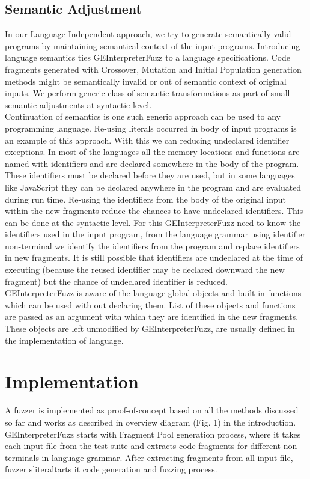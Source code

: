 \documentclass{sig-alternate}
\begin{document}
\subsection{Semantic Adjustment} \label{sec:semantics}
\indent In our Language Independent approach, we try to generate semantically valid programs by maintaining semantical context of the input programs. Introducing language semantics ties GEInterpreterFuzz to a language specifications. Code fragments generated with Crossover, Mutation and Initial Population generation   methods might be semantically invalid or out of semantic context of original inputs. We perform generic class of semantic transformations as part of small semantic adjustments at syntactic level. \\
\indent Continuation of semantics is one such generic approach can be used to any programming language. Re-using literals occurred in body of input programs is an example of this approach. With this we can reducing undeclared identifier exceptions. In most of the languages all the memory locations and functions are named with identifiers and are declared somewhere in the body of the program. These identifiers must be declared before they are used, but in some languages like JavaScript they can be declared anywhere in the program and are evaluated during run time. Re-using the identifiers from the body of the original input within the new fragments reduce the chances to have undeclared identifiers. This can be done at the syntactic level. For this GEInterpreterFuzz need to know the identifiers used in the input program, from the language grammar using identifier non-terminal we identify the identifiers from the program and replace identifiers in new fragments. It is still possible that identifiers are undeclared at the time of executing (because the reused identifier may be declared downward the new fragment) but the chance of undeclared identifier is reduced. \\
\indent GEInterpreterFuzz is aware of the language global objects and built in functions which can be used with out declaring them. List of these objects and functions are passed as an argument with which they are identified in the new fragments. These objects are left unmodified by GEInterpreterFuzz, are usually defined in the implementation of language.
\section{Implementation} \label{sec:impl}
\indent A fuzzer is implemented as proof-of-concept based on all the methods discussed so far and works as described in overview diagram (Fig. 1) in the introduction. GEInterpreterFuzz starts with Fragment Pool generation process, where it takes each input file from the test suite and extracts code fragments for different non-terminals in language grammar.
After extracting fragments from all input file, fuzzer sliteraltarts it code generation and fuzzing process.
\end{document}
